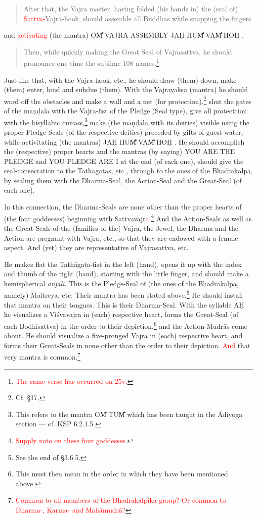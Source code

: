 \documentclass[11pt]{book}
\makeatletter
\def\fakesc#1{%
  \begingroup%
  \xdef\fake@name{\csname\curr@fontshape/\f@size\endcsname}%
  \fontsize{1.3\fontdimen8\fake@name}{\baselineskip}\selectfont%
  \uppercase{#1}%
  \endgroup%
}
\newcommand{\mantra}[1]{\fakesc{#1}}
\newcommand{\red}[1]{\textcolor{red}{#1}}
\newcommand{\skt}[1]{\emph{#1}}
\makeatother
\begin{document}
\begin{verse}
After that, the Vajra master, having folded (his hands in) the (seal of) \red{Sattva-}Vajra-hook, should assemble all Buddhas while snapping the fingers
\end{verse}

\noindent and \red{activating} (the mantra) \mantra{om̐ vajra assembly jaḥ hūm̐ vam̐ hoḥ}.

\begin{verse}
Then, while quickly making the Great Seal of Vajrasattva, he should pronounce one time the sublime 108 names.\footnote{\red{The same verse has occurred on 25v.}}
\end{verse}

Just like that, with the Vajra-hook, etc., he should draw (them) down, make (them) enter, bind and subdue (them). With the Vajrayakṣa (mantra) he should ward off the obstacles and make a wall and a net (for protection),\footnote{Cf. §17.} shut the gates of the maṇḍala with the Vajra-fist of the Pledge (Seal type), give all protecttion with the bisyllabic cuirass,\footnote{This refers to the mantra \mantra{om̐ tum̐} which has been taught in the Ādiyoga section — cf. KSP 6.2.1.5.} make (the maṇḍala with its deities) visible using the proper Pledge-Seals (of the respective deities) preceded by gifts of guest-water, while activitating (the mantras) \mantra{jaḥ hūm̐ vam̐ hoḥ}. He should accomplish the (respective) proper hearts and the mantras (by saying) \mantra{you are the pledge} and \mantra{you pledge are I} at the end (of each one), should give  the seal-consecration  to the Tathāgatas, etc., through to the ones of the Bhadrakalpa, by sealing them with the Dharma-Seal, the Action-Seal and the Great-Seal (of each one).

In this connection, the Dharma-Seals are none other than the proper hearts of (the four goddesses) beginning with Sattvavajr\red{a}.\footnote{\red{Supply note on these four goddesses}.} And the Action-Seals as well as the Great-Seals of the (families of the) Vajra, the Jewel, the Dharma and the Action are pregnant with Vajra, etc., so that they are endowed with a female aspect. And (yet) they are representative of Vajrasattva, etc.

He makes flat the Tathāgata-fist in the left (hand), opens it up with the index and thumb of the right (hand), starting with the little finger, and should make a hemispherical \skt{añjali}. This is the Pledge-Seal of (the ones of the Bhadrakalpa, namely) Maitreya, etc. Their mantra has been stated above.\footnote{See the end of §3.6.5.} He should install that mantra on their tongues. This is their Dharma-Seal. With the syllable \mantra{aḥ} he visualizes a Viśvavajra in (each) respective heart, forms the Great-Seal (of each Bodhisattva) in the order to their depiction,\footnote{This must then mean in the order in which they have been mentioned above.} and the Action-Mudrās come about. He should visualize a five-pronged Vajra in (each) respective heart, and forms their Great-Seals in none other than the order to their depiction. \red{And} that very mantra is common.\footnote{\red{Common to all members of the Bhadrakalpika group? Or common to Dharma-, Karma- and Mahāmudrā?}}
\end{document}
